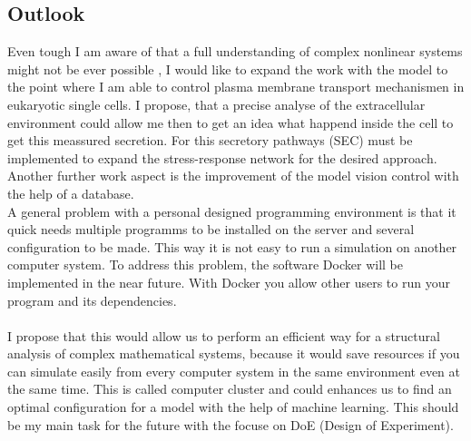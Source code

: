 \subsection{Outlook}
Even tough I am aware of that a full understanding of complex nonlinear systems might not be ever possible \cite{Noell2018}, 
I would like to expand the work with the model to the point where I am able to control plasma membrane transport mechanismen in eukaryotic single cells. I propose, that a precise analyse of the extracellular environment could allow me then to get an idea what happend inside the cell to get this meassured secretion. For this secretory pathways (SEC) must be implemented to expand the stress-response network for the desired approach.\\
Another further work aspect is the improvement of the model vision control with the help of a database. \\
A general problem with a personal designed programming environment is that it quick needs multiple programms to be installed on the server and several configuration to be made. This way it is not easy to run a simulation on another computer system. To address this problem, the software Docker will be implemented in the near future. With Docker you allow other users to run your program and its dependencies. \\\\I propose that this would allow us to perform an efficient way for a structural analysis of complex mathematical systems, because it would save resources if you can simulate easily from every computer system in the same environment even at the same time. This is called computer cluster and could enhances us to find an optimal configuration for a model with the help of machine learning. This should be my main task for the future with the focuse on DoE (Design of Experiment).
